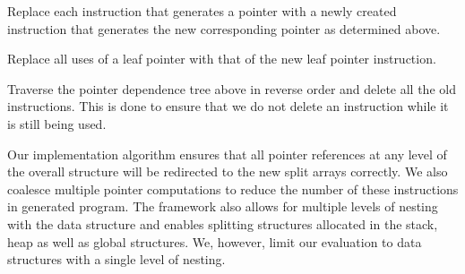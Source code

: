 \item Replace each instruction that generates a pointer with a newly created
instruction that generates the new corresponding pointer as determined above.

\item Replace all uses of a leaf pointer with that of the new leaf pointer
instruction.

\item Traverse the pointer dependence tree above in reverse order and delete all the
old instructions. This is done to ensure that we do not delete an instruction
while it is still being used.

\squishend

Our implementation algorithm ensures that all pointer references at any level of
the overall structure will be redirected to the new split arrays correctly. We
also coalesce multiple pointer computations to reduce the number of these
instructions in generated program. The framework also allows for multiple levels
of nesting with the data structure and enables splitting structures allocated in
the stack, heap as well as global structures. We, however, limit our evaluation
to data structures with a single level of nesting. 

